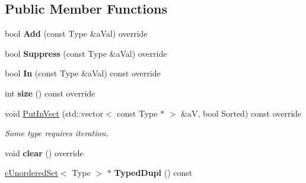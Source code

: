 \subsection*{Public Member Functions}
\begin{DoxyCompactItemize}
\item 
bool {\bfseries Add} (const Type \&a\+Val) override\hypertarget{classMMVII_1_1cUnorderedSet_adea629078bc2c843746914daf00aaa87}{}\label{classMMVII_1_1cUnorderedSet_adea629078bc2c843746914daf00aaa87}

\item 
bool {\bfseries Suppress} (const Type \&a\+Val) override\hypertarget{classMMVII_1_1cUnorderedSet_a113fc190acf9341c77908862a505f88a}{}\label{classMMVII_1_1cUnorderedSet_a113fc190acf9341c77908862a505f88a}

\item 
bool {\bfseries In} (const Type \&a\+Val) const override\hypertarget{classMMVII_1_1cUnorderedSet_a212df04004638335bb9b0e378cedc6a4}{}\label{classMMVII_1_1cUnorderedSet_a212df04004638335bb9b0e378cedc6a4}

\item 
int {\bfseries size} () const override\hypertarget{classMMVII_1_1cUnorderedSet_a0b3be49b0b7ad04339418b263bb31900}{}\label{classMMVII_1_1cUnorderedSet_a0b3be49b0b7ad04339418b263bb31900}

\item 
void \hyperlink{classMMVII_1_1cUnorderedSet_a54feb55eeb0667aaabb901d2c8c82974}{Put\+In\+Vect} (std\+::vector$<$ const Type $\ast$ $>$ \&aV, bool Sorted) const override\hypertarget{classMMVII_1_1cUnorderedSet_a54feb55eeb0667aaabb901d2c8c82974}{}\label{classMMVII_1_1cUnorderedSet_a54feb55eeb0667aaabb901d2c8c82974}

\begin{DoxyCompactList}\small\item\em Some type requires iteration. \end{DoxyCompactList}\item 
void {\bfseries clear} () override\hypertarget{classMMVII_1_1cUnorderedSet_a542f4fc635087c399bd45c8d4524f400}{}\label{classMMVII_1_1cUnorderedSet_a542f4fc635087c399bd45c8d4524f400}

\item 
\hyperlink{classMMVII_1_1cUnorderedSet}{c\+Unordered\+Set}$<$ Type $>$ $\ast$ {\bfseries Typed\+Dupl} () const \hypertarget{classMMVII_1_1cUnorderedSet_a6b5625f33bf2ef8e272e0b1a25a32da4}{}\label{classMMVII_1_1cUnorderedSet_a6b5625f33bf2ef8e272e0b1a25a32da4}


\end{DoxyCompactItemize}
